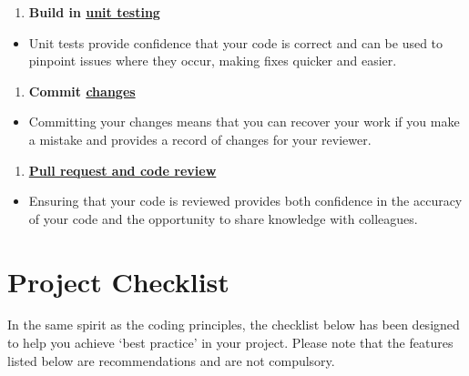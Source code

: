 \documentclass[]{book}
\providecommand{\tightlist}{%
  \setlength{\itemsep}{0pt}\setlength{\parskip}{0pt}}
\begin{document}
\begin{enumerate}
\def\labelenumi{\arabic{enumi}.}
\setcounter{enumi}{4}
\tightlist
\item
  \textbf{Build in \protect\hyperlink{unittest}{unit testing}}\\
\end{enumerate}

\begin{itemize}
\tightlist
\item
  Unit tests provide confidence that your code is correct and can be used to pinpoint issues where they occur, making fixes quicker and easier.\\
\end{itemize}

\begin{enumerate}
\def\labelenumi{\arabic{enumi}.}
\setcounter{enumi}{5}
\tightlist
\item
  \textbf{Commit \protect\hyperlink{versioncontrol}{changes}}\\
\end{enumerate}

\begin{itemize}
\tightlist
\item
  Committing your changes means that you can recover your work if you make a mistake and provides a record of changes for your reviewer.\\
\end{itemize}

\begin{enumerate}
\def\labelenumi{\arabic{enumi}.}
\setcounter{enumi}{6}
\tightlist
\item
  \textbf{\protect\hyperlink{review}{Pull request and code review}}\\
\end{enumerate}

\begin{itemize}
\tightlist
\item
  Ensuring that your code is reviewed provides both confidence in the accuracy of your code and the opportunity to share knowledge with colleagues.
\end{itemize}

\hypertarget{checklist}{%
\chapter{Project Checklist}\label{checklist}}

In the same spirit as the coding principles, the checklist below has been designed to help you achieve `best practice' in your project. Please note that the features listed below are recommendations and are not compulsory.
\end{document}
